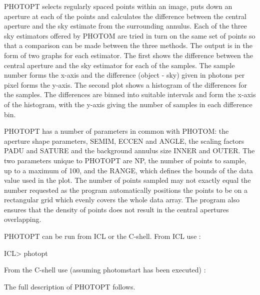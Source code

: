 \documentclass[twoside,11pt,nolof]{starlink}
\begin{document}
PHOTOPT selects regularly spaced points within an image, puts down an
aperture at each of the points and calculates the difference between
the central aperture and the sky estimate from the surrounding annulus.
Each of the three sky estimators offered by PHOTOM are tried in turn on
the same set of points so that a comparison can be made between the three
methods. The output is in the form of two graphs for each estimator. The
first shows the difference between the central aperture and the sky
estimator for each of the samples. The sample number forms the x-axis
and the difference (object - sky) given in photons per pixel forms
the y-axis. The second plot shows a histogram of the differences for
the samples. The differences are binned into suitable intervals and form
the x-axis of the histogram, with the y-axis giving the number of samples
in each difference bin.

PHOTOPT has a number of parameters in common with PHOTOM: the aperture
shape parameters, SEMIM, ECCEN and ANGLE, the scaling factors PADU and
SATURE and the background annulus size INNER and OUTER. The two
parameters unique to PHOTOPT are NP, the number of points to sample, up
to a maximum of 100, and the RANGE, which defines the bounds of the
data value used in the plot. The number of points sampled may not exactly
equal the number requested as the program automatically positions the
points to be on a rectangular grid which evenly covers the whole data array.
The program also ensures that the density of points does not result in
the central apertures overlapping.

PHOTOPT can be run from ICL or the C-shell. From ICL use :
\begin{terminalv}
ICL> photopt
\end{terminalv}
From the C-shell use (assuming photomstart has been executed) :
\begin{terminalv}
\end{terminalv}
The full description of PHOTOPT follows.
\end{document}
